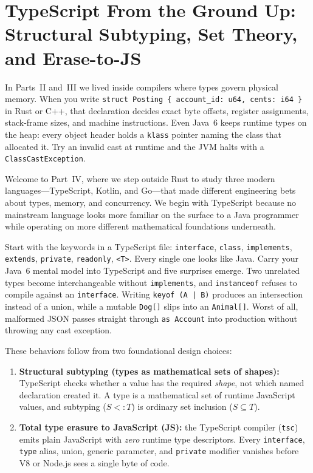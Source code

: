 \chapter{TypeScript From the Ground Up: Structural Subtyping, Set Theory, and Erase-to-JS}
\label{ch:typescript-structural-sets}

In Parts~II and~III we lived inside compilers where types govern physical memory. When you write \texttt{struct Posting \{ account\_id: u64, cents: i64 \}} in Rust or C++, that declaration decides exact byte offsets, register assignments, stack-frame sizes, and machine instructions. Even Java~6 keeps runtime types on the heap: every object header holds a \texttt{klass} pointer naming the class that allocated it. Try an invalid cast at runtime and the JVM halts with a \texttt{ClassCastException}.

Welcome to Part~IV, where we step outside Rust to study three modern languages---TypeScript, Kotlin, and Go---that made different engineering bets about types, memory, and concurrency. We begin with TypeScript because no mainstream language looks more familiar on the surface to a Java programmer while operating on more different mathematical foundations underneath.

Start with the keywords in a TypeScript file: \texttt{interface}, \texttt{class}, \texttt{implements}, \texttt{extends}, \texttt{private}, \texttt{readonly}, \texttt{<T>}. Every single one looks like Java. Carry your Java~6 mental model into TypeScript and five surprises emerge. Two unrelated types become interchangeable without \texttt{implements}, and \texttt{instanceof} refuses to compile against an \texttt{interface}. Writing \texttt{keyof (A | B)} produces an intersection instead of a union, while a mutable \texttt{Dog[]} slips into an \texttt{Animal[]}. Worst of all, malformed JSON passes straight through \texttt{as Account} into production without throwing any cast exception.

These behaviors follow from two foundational design choices:
\begin{enumerate}
  \item \textbf{Structural subtyping (types as mathematical sets of shapes):} TypeScript checks whether a value has the required \emph{shape}, not which named declaration created it. A type is a mathematical set of runtime JavaScript values, and subtyping ($S <: T$) is ordinary set inclusion ($S \subseteq T$).
  \item \textbf{Total type erasure to JavaScript (\textbf{JS}):} the TypeScript compiler (\texttt{tsc}) emits plain JavaScript with \emph{zero} runtime type descriptors. Every \texttt{interface}, \texttt{type} alias, union, generic parameter, and \texttt{private} modifier vanishes before V8 or Node.js sees a single byte of code.
\end{enumerate}

